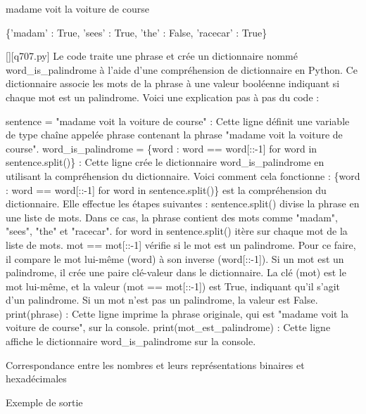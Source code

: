 madame voit la voiture de course

\{'madam' : True, 'sees' : True, 'the' : False, 'racecar' : True\}
        \par
        \begin{solution}
            \renewcommand{\nomfichier}{q707.py}
            \pythonfile{\chemincode \nomfichier}[][\nomfichier]
            Le code traite une phrase et crée un dictionnaire nommé word\_is\_palindrome à l'aide d'une compréhension de dictionnaire en Python. Ce dictionnaire associe les mots de la phrase à une valeur booléenne indiquant si chaque mot est un palindrome. Voici une explication pas à pas du code :

    sentence = "madame voit la voiture de course" : Cette ligne définit une variable de type chaîne appelée phrase contenant la phrase "madame voit la voiture de course".
    word\_is\_palindrome = \{word : word == word[::-1] for word in sentence.split()\} : Cette ligne crée le dictionnaire word\_is\_palindrome en utilisant la compréhension du dictionnaire. Voici comment cela fonctionne :
        \{word : word == word[::-1] for word in sentence.split()\} est la compréhension du dictionnaire. Elle effectue les étapes suivantes :
        sentence.split() divise la phrase en une liste de mots. Dans ce cas, la phrase contient des mots comme "madam", "sees", "the" et "racecar".
        for word in sentence.split() itère sur chaque mot de la liste de mots.
        mot == mot[::-1] vérifie si le mot est un palindrome. Pour ce faire, il compare le mot lui-même (word) à son inverse (word[::-1]).
        Si un mot est un palindrome, il crée une paire clé-valeur dans le dictionnaire. La clé (mot) est le mot lui-même, et la valeur (mot == mot[::-1]) est True, indiquant qu'il s'agit d'un palindrome.
        Si un mot n'est pas un palindrome, la valeur est False.
    print(phrase) : Cette ligne imprime la phrase originale, qui est "madame voit la voiture de course", sur la console.
    print(mot\_est\_palindrome) : Cette ligne affiche le dictionnaire word\_is\_palindrome sur la console.
        \end{solution}
        

        \question
        Correspondance entre les nombres et leurs représentations binaires et hexadécimales

Exemple de sortie

